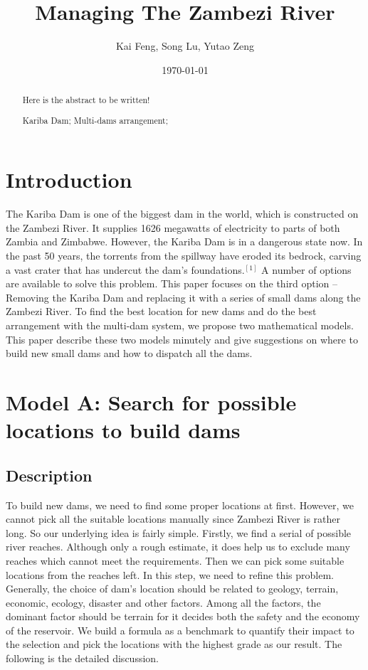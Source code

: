 \documentclass{mcmthesis}
\title{Managing The Zambezi River}
\author{Kai Feng, Song Lu, Yutao Zeng}
\date{\today}
\begin{document}
\begin{abstract}
Here is the abstract to be written!
\begin{keywords}
Kariba Dam; Multi-dams arrangement;
\end{keywords}
\end{abstract}
\maketitle
\section{Introduction}
\indent \indent The Kariba Dam is one of the biggest dam in the world, which is constructed on the Zambezi River. It supplies 1626 megawatts of electricity to parts of both Zambia and Zimbabwe. However, the Kariba Dam is in a dangerous state now. In the past 50 years, the torrents from the spillway have eroded its bedrock, carving a vast crater that has undercut the dam's foundations.$^{[1]}$ A number of options are available to solve this problem. This paper focuses on the third option -- Removing the Kariba Dam and replacing it with a series of small dams along the Zambezi River. To find the best location for new dams and do the best arrangement with the multi-dam system, we propose two mathematical models. This paper describe these two models minutely and give suggestions on where to build new small dams and how to dispatch all the dams. \\


\section{Model A: Search for possible locations to build dams}
\subsection{Description}
\indent \indent To build new dams, we need to find some proper locations at first. However, we cannot pick all the suitable locations manually since Zambezi River is rather long. So our underlying idea is fairly simple. Firstly, we find a serial of possible river reaches. Although only a rough estimate, it does help us to exclude many reaches which cannot meet the requirements. Then we can pick some suitable locations from the reaches left. In this step, we need to refine this problem. Generally, the choice of dam's location should be related to geology, terrain, economic, ecology, disaster and other factors. Among all the factors, the dominant factor should be terrain for it decides both the safety and the economy of the reservoir. We build a formula as a benchmark to quantify their impact to the selection and pick the locations with the highest grade as our result. The following is the detailed discussion. \\
\end{document}
